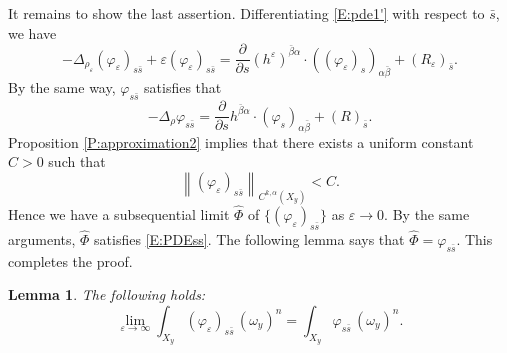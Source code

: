\documentclass{amsart}
\newtheorem{lemma}[theorem]{Lemma}
\theoremstyle{definition}
\numberwithin{equation}{section}
\begin{document}
It remains to show the last assertion. Differentiating \eqref{E:pde1'} with respect to $\bar s$, we have
\begin{equation*}
-\Delta_{\rho_{\varepsilon}}({\varphi}_{\varepsilon})_{s\bar s}
+
\varepsilon({\varphi}_{\varepsilon})_{s\bar s}
=
{\frac{\partial{}}{\partial{s}}}(h^{\varepsilon})^{\bar\beta\alpha}\cdot(({\varphi}_{\varepsilon})_s)_{\alpha\bar\beta}
+
(R_{\varepsilon})_{\bar s}.
\end{equation*}
By the same way, ${\varphi}_{s\bar s}$ satisfies that
\begin{equation}\label{E:PDEss}
-\Delta_\rho{\varphi}_{s\bar s}
=
{\frac{\partial{}}{\partial{s}}}h^{\bar\beta\alpha}\cdot({\varphi}_s)_{\alpha\bar\beta}
+
(R)_{\bar s}.
\end{equation}
Proposition \ref{P:approximation2} implies that there exists a uniform constant $C>0$ such that 
\begin{equation*}
{\left\|{({\varphi}_{\varepsilon})_{s\bar s}}\right\|}_{C^{k,\alpha}(X_y)}<C.
\end{equation*}
Hence we have a subsequential limit $\hat\Phi$ of $\{({\varphi}_{\varepsilon})_{s\bar s}\}$ as ${\varepsilon}\rightarrow0$. By the same arguments, $\hat\Phi$ satisfies \eqref{E:PDEss}. The following lemma says that $\hat\Phi={\varphi}_{s\bar s}$. This completes the proof.
\begin{lemma} \label{L:boundary2}
The following holds:
\begin{equation*}
\lim_{{\varepsilon}\rightarrow\infty}
\int_{X_y}({\varphi}_{\varepsilon})_{s\bar s}\,(\omega_y)^n
=
\int_{X_y}{\varphi}_{s\bar s}\,(\omega_y)^n.
\end{equation*}
\end{lemma}
\end{document}
